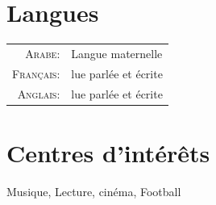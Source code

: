 \documentclass[a4paper,10pt]{article} %
\begin{document}

\section{Langues}

\begin{tabular}{rl}
\textsc{Arabe:} & Langue maternelle\\

\textsc{Français:} & lue parlée et écrite \\

\textsc{Anglais:} & lue parlée et écrite \\
\end{tabular}


\section{Centres d'intérêts }

Musique, Lecture, cinéma, Football \\
\end{document}
